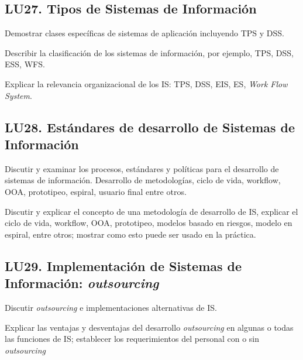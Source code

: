 \subsection{LU27. Tipos de Sistemas de Información}\label{sec:LU27}
\begin{LearningUnit}
\begin{LUGoal}
\item Demostrar clases específicas de sistemas de aplicación incluyendo TPS y DSS.
\end{LUGoal}

\begin{LUObjective}
\item Describir la clasificación de los sistemas de información, por  ejemplo, TPS, DSS, ESS, WFS.
\item Explicar la relevancia organizacional de los IS: TPS, DSS, EIS, ES, {\it Work Flow System}.
\end{LUObjective}
\end{LearningUnit}

\subsection{LU28. Estándares de desarrollo de Sistemas de Información}\label{sec:LU28}
\begin{LearningUnit}
\begin{LUGoal}
\item Discutir  y examinar los procesos, estándares y políticas para el desarrollo de sistemas de información. Desarrollo de metodologías, ciclo de vida, workflow, OOA, prototipeo, espiral, usuario final entre otros.
\end{LUGoal}

\begin{LUObjective}
\item Discutir y explicar el concepto de una metodología de desarrollo de IS, explicar el ciclo de vida, workflow, OOA, prototipeo, modelos basado en riesgos, modelo en espiral, entre otros; mostrar como esto puede ser usado en la práctica.   
\end{LUObjective}
\end{LearningUnit}

\subsection{LU29. Implementación de Sistemas de Información: \textit{outsourcing}}\label{sec:LU29}
\begin{LearningUnit}
\begin{LUGoal}
\item Discutir {\it outsourcing} e implementaciones alternativas de IS.
\end{LUGoal}

\begin{LUObjective}
\item Explicar las ventajas  y desventajas del desarrollo {\it outsourcing} en algunas o todas las funciones de IS; establecer  los requerimientos del personal con o sin {\it outsourcing}
\end{LUObjective}
\end{LearningUnit}


